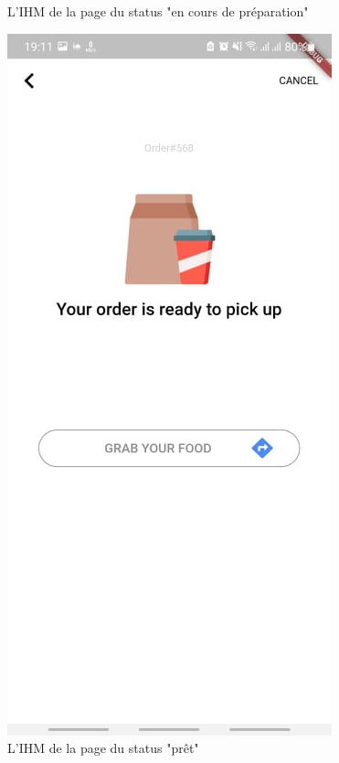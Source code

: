 \documentclass[french, a4paper, 12pt]{report}
\begin{document}
\begin{figure}[h!]
  \caption{L'IHM de la page du status "en cours de préparation"}\label{fig:orderprep}
\endminipage\hfill
{}%
  \includegraphics[width=\linewidth]{screenshots/ClientViews/orderready.jpg}
  \caption{L'IHM de la page du status "prêt"}\label{fig:orderready}
\endminipage
\end{figure}
\end{document}
